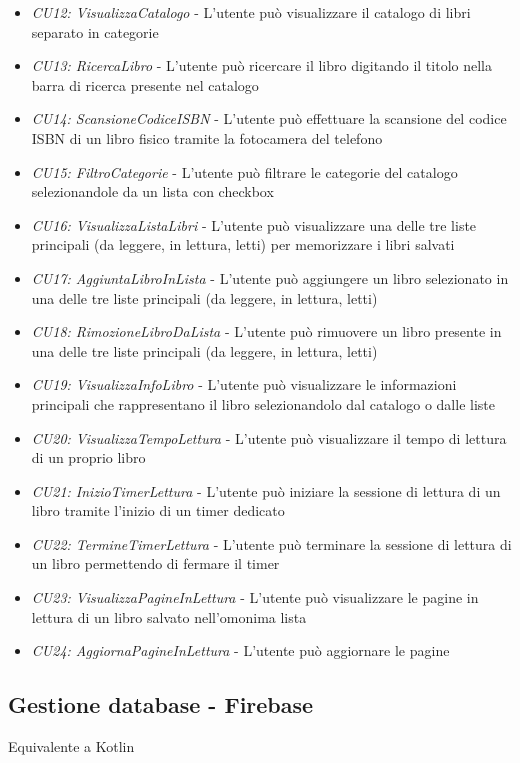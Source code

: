 \documentclass{article}
\begin{document}
\begin{itemize}[label=\textendash]
    \item \textit{CU12: VisualizzaCatalogo} - L'utente può visualizzare il catalogo di libri separato in categorie
    \item \textit{CU13: RicercaLibro} - L'utente può ricercare il libro digitando il titolo nella barra di ricerca presente nel catalogo
    \item \textit{CU14: ScansioneCodiceISBN} - L'utente può effettuare la scansione del codice ISBN di un libro fisico tramite la fotocamera del telefono
    \item \textit{CU15: FiltroCategorie} - L'utente può filtrare le categorie del catalogo selezionandole da un lista con checkbox
    \item \textit{CU16: VisualizzaListaLibri} - L'utente può visualizzare una delle tre liste principali (da leggere, in lettura, letti) per memorizzare i libri salvati
    \item \textit{CU17: AggiuntaLibroInLista} - L'utente può aggiungere un libro selezionato in una delle tre liste principali (da leggere, in lettura, letti)
    \item \textit{CU18: RimozioneLibroDaLista} - L'utente può rimuovere un libro presente in una delle tre liste principali (da leggere, in lettura, letti)
    \item \textit{CU19: VisualizzaInfoLibro} - L'utente può visualizzare le informazioni principali che rappresentano il libro selezionandolo dal catalogo o dalle liste
    \item \textit{CU20: VisualizzaTempoLettura} - L'utente può visualizzare il tempo di lettura di un proprio libro
    \item \textit{CU21: InizioTimerLettura} - L'utente può iniziare la sessione di lettura di un libro tramite l'inizio di un timer dedicato
    \item \textit{CU22: TermineTimerLettura} - L'utente può terminare la sessione di lettura di un libro permettendo di fermare il timer
    \item \textit{CU23: VisualizzaPagineInLettura} - L'utente può visualizzare le pagine in lettura di un libro salvato nell'omonima lista
    \item \textit{CU24: AggiornaPagineInLettura} - L'utente può aggiornare le pagine 
\end{itemize}

\subsection{Gestione database - Firebase}
Equivalente a Kotlin
\end{document}
